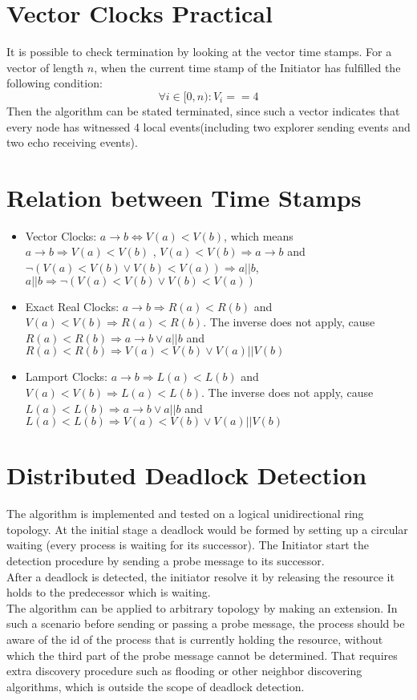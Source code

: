 \documentclass[a4paper, 14pt]{article}
\begin{document}
\section{Vector Clocks Practical}
It is possible to check termination by looking at the vector time stamps. For a vector of length $n$, when the current time stamp of the Initiator has fulfilled the following condition:
\[ \forall i \in [0,n): V_i == 4\]
Then the algorithm can be stated terminated, since such a vector indicates that every node has witnessed 4 local events(including two explorer sending events and two echo receiving events).

\section{Relation between Time Stamps}
\begin{itemize}
\item Vector Clocks: $a \rightarrow b \Leftrightarrow V(a) < V(b)$, which means $ a \rightarrow b \Rightarrow V(a) < V(b)$ , $V(a) < V(b) \Rightarrow a \rightarrow b$ and $\neg (V(a) < V(b) \vee V(b) < V(a)) \Rightarrow a||b$, $a||b \Rightarrow \neg (V(a) < V(b) \vee V(b) < V(a))$
\item Exact Real Clocks: $a \rightarrow b \Rightarrow R(a) < R(b)$ and $V(a) < V(b) \Rightarrow R(a) < R(b)$. The inverse does not apply, cause $R(a) < R(b) \Rightarrow a \rightarrow b \vee a||b$ and $R(a) < R(b) \Rightarrow V(a) < V(b) \vee V(a)||V(b)$
\item Lamport Clocks: $a \rightarrow b \Rightarrow L(a) < L(b)$ and $V(a) < V(b) \Rightarrow L(a) < L(b)$. The inverse does not apply, cause $L(a) < L(b) \Rightarrow a \rightarrow b \vee a||b$ and $L(a) < L(b) \Rightarrow V(a) < V(b) \vee V(a)||V(b)$
\end{itemize}

\section{Distributed Deadlock Detection}
The algorithm is implemented and tested on a logical unidirectional ring topology. At the initial stage a deadlock would be formed by setting up a circular waiting (every process is waiting for its successor). The Initiator start the detection procedure by sending a probe message to its successor.\\
After a deadlock is detected, the initiator resolve it by releasing the resource it holds to the predecessor which is waiting.\\
The algorithm can be applied to arbitrary topology by making an extension. In such a scenario before sending or passing a probe message, the process should be aware of the id of the process that is currently holding the resource, without which the third part of the probe message cannot be determined. That requires extra discovery procedure such as flooding or other neighbor discovering algorithms, which is outside the scope of deadlock detection.

%
\end{document}
